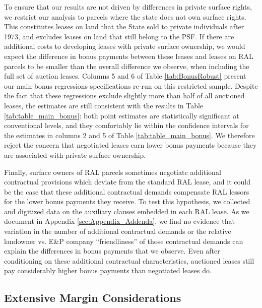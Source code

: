 \documentclass[12pt]{article}
\begin{document}
To ensure that our results are not driven by differences in private surface rights, we restrict our analysis to parcels where the state does not own surface rights. This constitutes leases on land that the State sold to private individuals after 1973, and excludes leases on land that still belong to the PSF.  If there are additional costs to developing leases with private surface ownership, we would expect the difference in bonus payments between these leases and leases on RAL parcels to be smaller than the overall difference we observe, when including the full set of auction leases. Columns 5 and 6 of Table \ref{tab:BonusRobust} present our main bonus regressions specifications re-run on this restricted sample. Despite the fact that these regressions exclude slightly more than half of all auctioned leases, the estimates are still consistent with the results in Table \ref{tab:table_main_bonus}: both point estimates are statistically significant at conventional levels, and they comfortably lie within the confidence intervals for the estimates in columns 2 and 5 of Table \ref{tab:table_main_bonus}.  We therefore reject the concern that negotiated leases earn lower bonus payments because they are associated with private surface ownership.

Finally, surface owners of RAL parcels sometimes negotiate additional contractual provisions which deviate from the standard RAL lease, and it could be the case that these additional contractual demands compensate RAL lessors for the lower bonus payments they receive.  To test this hypothesis, we collected and digitized data on the auxiliary clauses embedded in each RAL lease.  As we document in Appendix \ref{sec:Appendix_Addenda}, we find no evidence that variation in the number of additional contractual demands or the relative landowner vs. E\&P company ``friendliness'' of those contractual demands can explain the differences in bonus payments that we observe.   Even after conditioning on these additional contractual characteristics, auctioned leases still pay considerably higher bonus payments than negotiated leases do.

\subsection{Extensive Margin Considerations \label{sec:ExtensiveMargin}}
\end{document}
